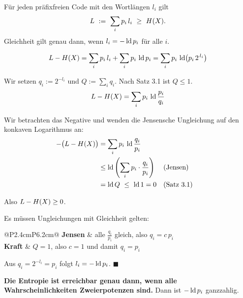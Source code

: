 \begin{merksatz}
Für jeden präfixfreien Code mit den Wortlängen $l_i$ gilt
\[ L \ :=\ \sum_i p_i\,l_i \ \ge\ H(X) . \]
Gleichheit gilt genau dann, wenn $l_i = -\operatorname{ld} p_i$ für alle $i$.

\[ L - H(X) = \sum_i p_i\,l_i + \sum_i p_i\,\operatorname{ld} p_i = \sum_i p_i\,\operatorname{ld}\bigl(p_i\,2^{\,l_i}\bigr) \]

Wir setzen $q_i := 2^{-l_i}$ und $Q := \sum_i q_i$. Nach Satz 3.1 ist $Q \le 1$.
\[ L - H(X) = \sum_i p_i\,\operatorname{ld}\frac{p_i}{q_i} \]

Wir betrachten das Negative und wenden die Jensensche Ungleichung auf den konkaven Logarithmus an:
\begin{align*}
-\bigl(L-H(X)\bigr) &= \sum_i p_i\,\operatorname{ld}\frac{q_i}{p_i}\\
&\le \operatorname{ld}\left(\sum_i p_i\cdot\frac{q_i}{p_i}\right) && \text{(Jensen)}\\
&= \operatorname{ld} Q \ \le\ \operatorname{ld} 1 = 0 && \text{(Satz 3.1)}
\end{align*}

Also $L - H(X) \ge 0$. \checkmark

Es müssen  Ungleichungen mit Gleichheit gelten:
\begin{center}
\renewcommand{\arraystretch}{1.5}
\begin{tabular}{@{}P{2.4cm}P{6.2cm}@{}}
\toprule
\textbf{Jensen} & alle $\frac{q_i}{p_i}$ gleich, also $q_i = c\,p_i$\\
\textbf{Kraft} & $Q = 1$, also $c = 1$ und damit $q_i = p_i$\\
\bottomrule
\end{tabular}
\end{center}

Aus $q_i = 2^{-l_i} = p_i$ folgt $l_i = -\operatorname{ld} p_i$. $\blacksquare$

\begin{center}
\begin{minipage}{0.9\textwidth}
\textbf{Die Entropie ist erreichbar genau dann, wenn alle Wahrscheinlichkeiten Zweierpotenzen sind.} Dann ist $-\operatorname{ld} p_i$ ganzzahlig.
\end{minipage}
\end{center}

\begin{center}
\begin{minipage}{0.88\textwidth}
\end{minipage}
\end{center}
\end{merksatz}

